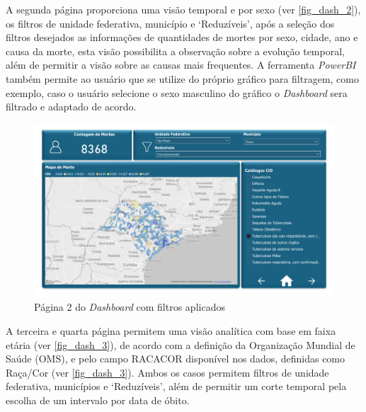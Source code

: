 A segunda página proporciona uma visão temporal e por sexo (ver \autoref{fig_dash_2}), os filtros de unidade federativa, município e `Reduzíveis', após a seleção dos filtros desejados as informações de quantidades de mortes por sexo, cidade, ano e causa da morte, esta visão possibilita a observação sobre a evolução temporal, além de permitir a visão sobre as causas mais frequentes. A ferramenta \textit{PowerBI} também permite ao usuário que se utilize do próprio gráfico para filtragem, como exemplo, caso o usuário selecione o sexo masculino do gráfico o \textit{Dashboard} sera filtrado e adaptado de acordo.

\begin{figure}[H]
	\caption{\label{fig_dash_2}Página 2 do \textit{Dashboard} com filtros aplicados}
	\begin{center}
		\includegraphics[width=\textwidth, page = 2]{USPSC-img/dash}
	\end{center}
\end{figure}

A terceira e quarta página permitem uma visão analítica com base em faixa etária (ver \autoref{fig_dash_3}), de acordo com a definição da Organização Mundial de Saúde (OMS), e pelo campo RACACOR disponível nos dados, definidas como Raça/Cor (ver \autoref{fig_dash_3}). Ambos os casos permitem filtros de unidade federativa, municípios e `Reduzíveis', além de permitir um corte temporal pela escolha de um intervalo por data de óbito.

